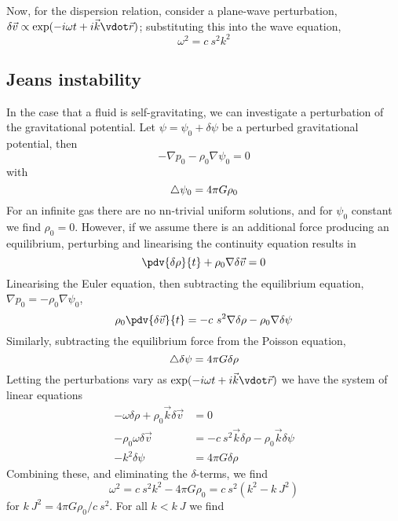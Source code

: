 Now, for the dispersion relation, consider a plane-wave perturbation,
$\delta \vec{v} \propto \exp(-i \omega t + i \vec{k} \vdot \vec{r})$; substituting this into the wave equation,
\begin{equation}
  \label{eq:67}
  \omega^2 = c~s^2 k^2
\end{equation}

\subsection{Jeans instability}
\label{sec:jeans-instability}

In the case that a fluid is self-gravitating, we can investigate a
perturbation of the gravitational potential. Let $\psi = \psi_0 +
\delta \psi$ be a perturbed gravitational potential, then
\[ - \nabla p_0 - \rho_0 \nabla \psi_0 = 0 \] with
\[ \bigtriangleup \psi_0 = 4 \pi G \rho_0 \] For an infinite gas there are no
nn-trivial uniform solutions, and for $\psi_0$ constant we find
$\rho_0 = 0$. However, if we assume there is an additional force
producing an equilibrium, perturbing and linearising the continuity
equation results in
\[ \pdv{\delta \rho}{t} + \rho_0 \nabla \delta \vec{v} = 0 \]
Linearising the Euler equation, then subtracting the equilibrium
equation, $\nabla p_0 = - \rho_0 \nabla \psi_0$,
\[ \rho_0 \pdv{\delta \vec{v}}{t} = -c~s^2 \nabla \delta \rho - \rho_0 \nabla \delta \psi \]
Similarly, subtracting the equilibrium force from the Poisson equation,
\begin{equation}
  \label{eq:68}
  \bigtriangleup \delta \psi = 4 \pi G \delta \rho
\end{equation}
Letting the perturbations vary as $\exp(-i \omega t + i \vec{k} \vdot
\vec{r})$ we have the system of linear equations
\begin{subequations}
  \begin{align}
    - \omega \delta \rho + \rho_0 \vec{k} \delta \vec{v} &= 0 \\
- \rho_0 \omega \delta \vec{v} &= - c~s^2 \vec{k} \delta \rho - \rho_0 \vec{k} \delta \psi \\
- k^2 \delta \psi &= 4 \pi G \delta \rho
  \end{align}
\end{subequations}
Combining these, and eliminating the $\delta$-terms, we find
\begin{equation}
  \label{eq:69}
  \omega^2 = c~s^2 k^2 - 4 \pi G \rho_0 = c~s^2 (k^2 - k~J^2)
\end{equation}
for $k~J^2 = 4 \pi G \rho_0 / c~s^2$. For all $k < k~J$ we find
